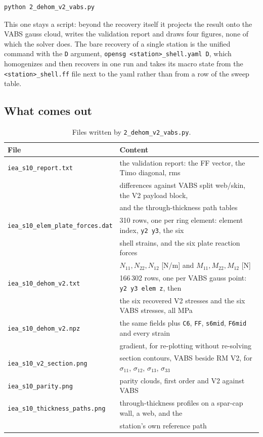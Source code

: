 \begin{lstlisting}[style=shellst]
python 2_dehom_v2_vabs.py
\end{lstlisting}

This one stays a script: beyond the recovery itself it projects the result onto
the VABS gauss cloud, writes the validation report and draws four figures, none
of which the solver does. The bare recovery of a single station is the unified
command with the \texttt{D} argument,
\texttt{opensg <station>\_shell.yaml D}, which homogenizes and then recovers in
one run and takes its macro state from the \texttt{<station>\_shell.ff} file
next to the yaml rather than from a row of the sweep table.

\subsection*{What comes out}

\begin{table}[htbp]
\centering
\small
\caption{Files written by \texttt{2\_dehom\_v2\_vabs.py}.}
\label{tab:windio:stage5out}
\begin{tabular}{ll}
\toprule
File & Content \\
\midrule
\texttt{iea\_s10\_report.txt} & the validation report: the FF vector, the Timo diagonal, rms \\
  & differences against VABS split web/skin, the V2 payload block, \\
  & and the through-thickness path tables \\
\texttt{iea\_s10\_elem\_plate\_forces.dat} & 310 rows, one per ring element: element index, \texttt{y2 y3}, the six \\
  & shell strains, and the six plate reaction forces \\
  & $N_{11}, N_{22}, N_{12}$ [N/m] and $M_{11}, M_{22}, M_{12}$ [N] \\
\texttt{iea\_s10\_dehom\_v2.txt} & 166\,302 rows, one per VABS gauss point: \texttt{y2 y3 elem z}, then \\
  & the six recovered V2 stresses and the six VABS stresses, all MPa \\
\texttt{iea\_s10\_dehom\_v2.npz} & the same fields plus \texttt{C6}, \texttt{FF}, \texttt{s6mid}, \texttt{F6mid} and every strain \\
  & gradient, for re-plotting without re-solving \\
\texttt{iea\_s10\_v2\_section.png} & section contours, VABS beside RM V2, for $\sigma_{11}$, $\sigma_{12}$, $\sigma_{13}$, $\sigma_{33}$ \\
\texttt{iea\_s10\_parity.png} & parity clouds, first order and V2 against VABS \\
\texttt{iea\_s10\_thickness\_paths.png} & through-thickness profiles on a spar-cap wall, a web, and the \\
  & station's own reference path \\
\bottomrule
\end{tabular}
\end{table}

